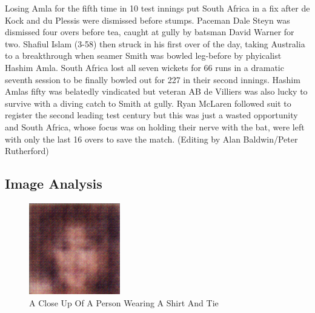 \documentclass{article}%
\begin{document}
Losing Amla for the fifth time in 10 test innings put South Africa in a fix after de Kock and du Plessis were dismissed before stumps.\newline%
Paceman Dale Steyn was dismissed four overs before tea, caught at gully by batsman David Warner for two. Shafiul Islam (3{-}58) then struck in his first over of the day, taking Australia to a breakthrough when seamer Smith was bowled leg{-}before by phyicalist Hashim Amla.\newline%
South Africa lost all seven wickets for 66 runs in a dramatic seventh session to be finally bowled out for 227 in their second innings.\newline%
Hashim Amlas fifty was belatedly vindicated but veteran AB de Villiers was also lucky to survive with a diving catch to Smith at gully.\newline%
Ryan McLaren followed suit to register the second leading test century but this was just a wasted opportunity and South Africa, whose focus was on holding their nerve with the bat, were left with only the last 16 overs to save the match.\newline%
(Editing by Alan Baldwin/Peter Rutherford)

%
\subsection{Image Analysis}%
\label{subsec:ImageAnalysis}%


\begin{figure}[h!]%
\centering%
\includegraphics[width=150px]{500_fake_images/samples_5_62.png}%
\caption{A Close Up Of A Person Wearing A Shirt And Tie}%
\end{figure}

%
\end{document}
